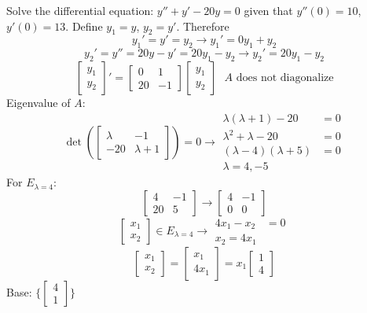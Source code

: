 \documentclass[12pt]{article}
\begin{document}
\begin{example} Solve the differential equation: $y'' + y' - 20y = 0$ given that $y''(0) = 10$, $y'(0) = 13$. \newline 
Define $y_1 = y$, $y_2 = y'$. Therefore $$y_1' = y' = y_2 \rightarrow y_1' = 0y_1 + y_2$$ 
$$y_2' = y'' = 20y - y' = 20y_1 - y_2 \rightarrow y_2' = 20y_1 - y_2$$ 
$$\begin{bmatrix} y_1 \\ y_2 \end{bmatrix}' = \begin{bmatrix} 0 & 1 \\ 20 & -1 \end{bmatrix}\begin{bmatrix} y_1 \\ y_2 \end{bmatrix} \text{ $A$ does not diagonalize} $$
Eigenvalue of $A$: $$\det(\begin{bmatrix} \lambda & -1 \\ -20 & \lambda + 1 \end{bmatrix}) = 0 \rightarrow \begin{aligned} \lambda(\lambda + 1) - 20 &= 0 \\ \lambda^2 + \lambda - 20 &= 0 \\ (\lambda - 4)(\lambda + 5) &= 0 \\ \lambda = 4, -5 \end{aligned} $$ 
For $E_{\lambda = 4}$: $$\begin{bmatrix} 4 & -1 \\ 20 & 5 \end{bmatrix} \rightarrow \begin{bmatrix} 4 & -1 \\ 0 & 0 \end{bmatrix} $$ $$\begin{bmatrix} x_1 \\ x_2 \end{bmatrix} \in E_{\lambda = 4} \rightarrow \begin{aligned} 4x_1 - x_2 &= 0 \\ x_2 = 4x_1 \end{aligned} $$ $$\begin{bmatrix} x_1 \\ x_2 \end{bmatrix} = \begin{bmatrix} x_1 \\ 4x_1 \end{bmatrix} = x_1\begin{bmatrix} 1 \\ 4 \end{bmatrix} $$ Base: $\{\begin{bmatrix} 4 \\ 1 \end{bmatrix}\}$ \newline

\end{example}
\end{document}
